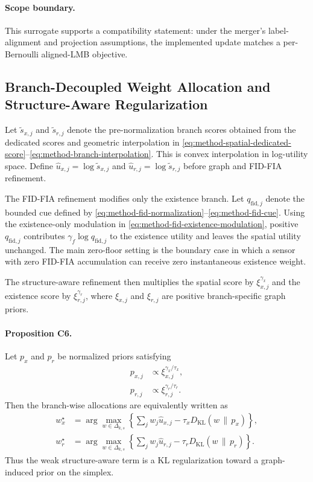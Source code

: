 \paragraph{Scope boundary.}
This surrogate supports a compatibility statement: under the merger's label-alignment and projection assumptions, the implemented update matches a per-Bernoulli aligned-LMB objective.

\subsection{Branch-Decoupled Weight Allocation and Structure-Aware Regularization}

Let $\tilde s_{x,j}$ and $\tilde s_{r,j}$ denote the pre-normalization branch scores obtained from the dedicated scores and geometric interpolation in \eqref{eq:method-spatial-dedicated-score}--\eqref{eq:method-branch-interpolation}. This is convex interpolation in log-utility space. Define $\hat u_{x,j}=\log \tilde s_{x,j}$ and $\hat u_{r,j}=\log \tilde s_{r,j}$ before graph and FID-FIA refinement.

The FID-FIA refinement modifies only the existence branch. Let $q_{\mathrm{fid},j}$ denote the bounded cue defined by \eqref{eq:method-fid-normalization}--\eqref{eq:method-fid-cue}. Using the existence-only modulation in \eqref{eq:method-fid-existence-modulation}, positive $q_{\mathrm{fid},j}$ contributes $\gamma_f\log q_{\mathrm{fid},j}$ to the existence utility and leaves the spatial utility unchanged. The main zero-floor setting is the boundary case in which a sensor with zero FID-FIA accumulation can receive zero instantaneous existence weight.

The structure-aware refinement then multiplies the spatial score by $\xi_{x,j}^{\gamma_x}$ and the existence score by $\xi_{r,j}^{\gamma_r}$, where $\xi_{x,j}$ and $\xi_{r,j}$ are positive branch-specific graph priors.

\paragraph{Proposition C6.}
Let $p_x$ and $p_r$ be normalized priors satisfying
\begin{align}
p_{x,j} &\propto \xi_{x,j}^{\gamma_x/\tau_x}, \\
p_{r,j} &\propto \xi_{r,j}^{\gamma_r/\tau_r}.
\end{align}
Then the branch-wise allocations are equivalently written as
\begin{align}
w_x^\star
&=
\arg\max_{w \in \Delta_{k,s}}
\left\{
\sum_j w_j \hat u_{x,j}
- \tau_x D_{\mathrm{KL}}(w \,\|\, p_x)
\right\},
\\
w_r^\star
&=
\arg\max_{w \in \Delta_{k,s}}
\left\{
\sum_j w_j \hat u_{r,j}
- \tau_r D_{\mathrm{KL}}(w \,\|\, p_r)
\right\}.
\end{align}
Thus the weak structure-aware term is a KL regularization toward a graph-induced prior on the simplex.

